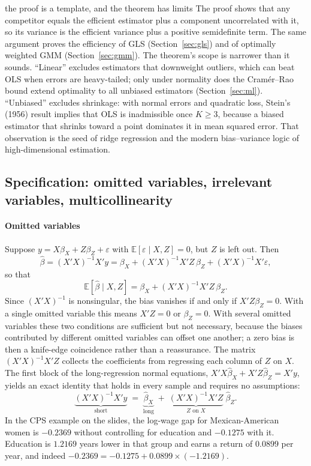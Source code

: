 \documentclass[11pt,a4paper]{article}
\newcommand{\E}{\mathbb{E}}
\newcommand{\bh}{\hat\beta}
\begin{document}
\begin{whybox}{the proof is a template, and the theorem has limits}
The proof shows that any competitor equals the efficient estimator plus a component uncorrelated with it, so its variance is the efficient variance plus a positive semidefinite term. The same argument proves the efficiency of GLS (Section~\ref{sec:gls}) and of optimally weighted GMM (Section~\ref{sec:gmm}). The theorem's scope is narrower than it sounds. ``Linear'' excludes estimators that downweight outliers, which can beat OLS when errors are heavy-tailed; only under normality does the Cram\'er--Rao bound extend optimality to all unbiased estimators (Section~\ref{sec:ml}). ``Unbiased'' excludes shrinkage: with normal errors and quadratic loss, Stein's (1956) result implies that OLS is inadmissible once $K\geq3$, because a biased estimator that shrinks toward a point dominates it in mean squared error. That observation is the seed of ridge regression and the modern bias--variance logic of high-dimensional estimation.
\end{whybox}

\subsection{Specification: omitted variables, irrelevant variables, multicollinearity}

\paragraph{Omitted variables}
Suppose $y = X\beta_X+Z\beta_Z+\varepsilon$ with $\E[\varepsilon\mid X,Z]=0$, but $Z$ is left out. Then
\[
\bh=(X'X)^{-1}X'y=\beta_X+(X'X)^{-1}X'Z\,\beta_Z+(X'X)^{-1}X'\varepsilon,
\]
so that
\begin{equation}\label{eq:ovb}
\E[\bh\mid X,Z] = \beta_X + (X'X)^{-1}X'Z\,\beta_Z .
\end{equation}
Since $(X'X)^{-1}$ is nonsingular, the bias vanishes if and only if $X'Z\beta_Z=0$. With a single omitted variable this means $X'Z=0$ or $\beta_Z=0$. With several omitted variables these two conditions are sufficient but not necessary, because the biases contributed by different omitted variables can offset one another; a zero bias is then a knife-edge coincidence rather than a reassurance. The matrix $(X'X)^{-1}X'Z$ collects the coefficients from regressing each column of $Z$ on $X$. The first block of the long-regression normal equations, $X'X\bh_X + X'Z\bh_Z = X'y$, yields an exact identity that holds in every sample and requires no assumptions:
\begin{equation}\label{eq:shortlong}
\underbrace{(X'X)^{-1}X'y}_{\text{short}} \;=\; \underbrace{\bh_X}_{\text{long}} \;+\; \underbrace{(X'X)^{-1}X'Z}_{Z\text{ on }X}\;\bh_Z .
\end{equation}
In the CPS example on the slides, the log-wage gap for Mexican-American women is $-0.2369$ without controlling for education and $-0.1275$ with it. Education is $1.2169$ years lower in that group and earns a return of $0.0899$ per year, and indeed $-0.2369=-0.1275+0.0899\times(-1.2169)$.
\end{document}
